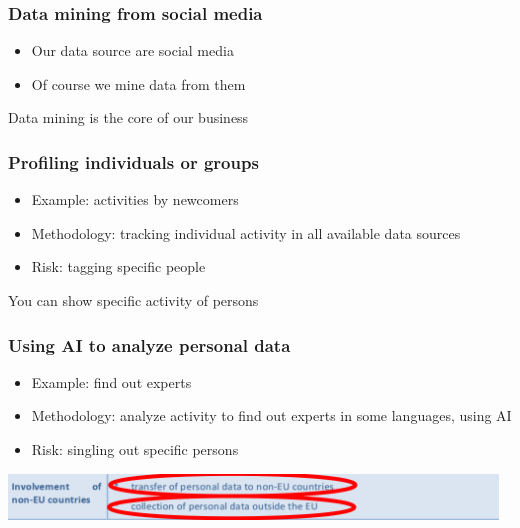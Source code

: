 \documentclass[17pt,aspectratio=169,hyperref={pdfusetitle,colorlinks,allcolors=olive}]{beamer}
\begin{document}
\begin{frame}[fragile]
  \frametitle{Data mining from social media}

  \begin{itemize}
  \item Our data source are social media
  \item Of course we mine data from them
  \end{itemize}

  \begin{flushright}
    Data mining is the core of our business
  \end{flushright}
\end{frame}

\begin{frame}[fragile]
  \frametitle{Profiling individuals or groups}

  \begin{itemize}
  \item Example: activities by newcomers

  \item Methodology: tracking individual activity in all available data sources

  \item Risk: tagging specific people
  \end{itemize}
  
  \begin{flushright}
    You can show specific activity of persons
  \end{flushright}
\end{frame}

\begin{frame}[fragile]
  \frametitle{Using AI to analyze personal data}

  \begin{itemize}
  \item Example: find out experts

  \item Methodology: analyze activity to find out experts in some languages, using AI

  \item Risk: singling out specific persons
  \end{itemize}
  
\end{frame}

\begin{frame}[fragile]
  \vspace{-1.6cm}
  \begin{center}
    \includegraphics[width=13cm]{figs/gdpr-higher-risks-annotated-intl}
  \end{center}
\end{frame}
\end{document}
